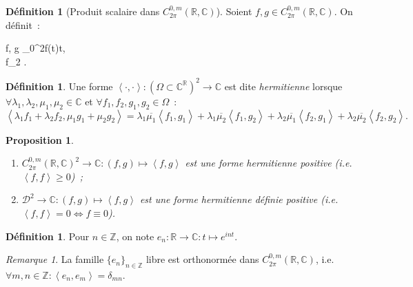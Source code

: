 \documentclass{report}
\newtheorem{prp}[thm]{Proposition}
\theoremstyle{definition}
\newtheorem{déf}[thm]{Définition}
\theoremstyle{remark}
\newtheorem*{rmq}{Remarque}
\numberwithin{equation}{section}
\newcommand{\C}{\mathbb C}
\newcommand{\R}{\mathbb R}
\newcommand{\Z}{\mathbb Z}
\newcommand{\scpr}[2]{\left\langle #1, #2\right\rangle}
\newcommand{\CmT}[2]{C^{#1,m}_{#2}}
\newcommand{\CzmT}[1]{\CmT 0{#1}}
\newcommand{\Czm}{\CzmT{2\pi}}
\begin{document}
			\begin{déf}[Produit scalaire dans $\Czm(\R, \C)$] Soient $f, g \in \Czm(\R, \C)$. On définit~:
			\begin{subnumcases}{}
				\scpr fg \coloneqq {}\int_0^{2\pi}f(t)\dif t, \\
				\norm f_2 \coloneqq \sqrt {\scpr ff}.
			\end{subnumcases}
			\end{déf}

			\begin{déf} Une forme $\scpr \cdot\cdot : \left(\Omega \subset \C^\R\right)^2 \to \C$ est dite \textit{hermitienne} lorsque
			$\forall \lambda_1, \lambda_2, \mu_1, \mu_2 \in \C$ et $\forall f_1, f_2, g_1, g_2 \in \Omega$~:
			\begin{equation}
					\scpr {\lambda_1 f_1 + \lambda_2 f_2}{\mu_1 g_1 + \mu_2 g_2}
						= \lambda_1\overline {\mu_1}\scpr {f_1}{g_1}
						+ \lambda_1\overline {\mu_2}\scpr {f_1}{g_2}
						+ \lambda_2\overline {\mu_1}\scpr {f_2}{g_1}
						+ \lambda_2\overline {\mu_2}\scpr {f_2}{g_2}.
			\end{equation}
			\end{déf}

			\begin{prp}\label{prp:prop scpr Czm}~
				\begin{enumerate}
					\item $\Czm(\R, \C)^2 \to \C : (f, g) \mapsto \scpr fg$ est une forme hermitienne positive (i.e. $\scpr ff \geq 0$)~;
					\item $\mathcal D^2 \to \C : (f, g) \mapsto \scpr fg$ est une forme hermitienne définie positive (i.e. $\scpr ff = 0 \iff f \equiv 0$).
				\end{enumerate}
			\end{prp}

			\begin{déf} Pour $n \in \Z$, on note $e_n : \R \to \C : t \mapsto e^{int}$.
			\end{déf}

			\begin{rmq} La famille $\{e_n\}_{n \in \Z}$ libre est orthonormée dans $\Czm(\R, \C)$, i.e. $\forall m, n \in \Z : \scpr {e_n}{e_m} = \delta_{mn}$.
			\end{rmq}
\end{document}
